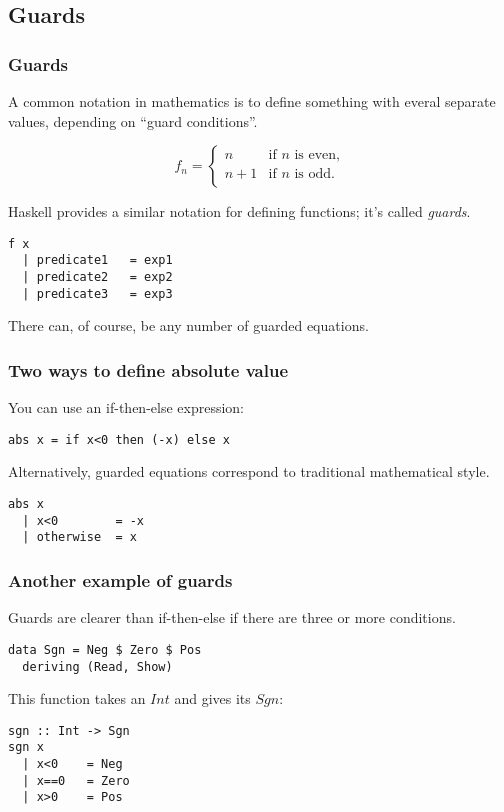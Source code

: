 \documentclass{beamer}
\begin{document}
\subsection{Guards}

\begin{frame}[fragile]
\frametitle{Guards}

A common notation in mathematics is to define something with everal
separate values, depending on ``guard conditions''.

\begin{equation}
f_{n} =
\begin{cases}
  n  & \text{if $n$ is even,} \\
  n+1  & \text{if $n$ is odd.} \\
\end{cases}
\end{equation}

Haskell provides a similar notation for defining functions; it's
called \emph{guards}.

\begin{verbatim}
f x
  | predicate1   = exp1 
  | predicate2   = exp2
  | predicate3   = exp3
\end{verbatim}

There can, of course, be any number of guarded equations.

\end{frame}

\begin{frame}[fragile]
\frametitle{Two ways to define absolute value}

You can use an if-then-else expression:

\begin{verbatim}
abs x = if x<0 then (-x) else x
\end{verbatim}

Alternatively, guarded equations correspond to traditional
mathematical style.

\begin{verbatim}
abs x
  | x<0        = -x
  | otherwise  = x
\end{verbatim}

\end{frame}

\begin{frame}[fragile]
\frametitle{Another example of guards}

Guards are clearer than if-then-else if there are three or more
conditions.

\begin{verbatim}
data Sgn = Neg $ Zero $ Pos
  deriving (Read, Show)
\end{verbatim}

This function takes an $Int$ and gives its $Sgn$:

\begin{verbatim}
sgn :: Int -> Sgn
sgn x
  | x<0    = Neg
  | x==0   = Zero
  | x>0    = Pos
\end{verbatim}

\end{frame}
\end{document}
